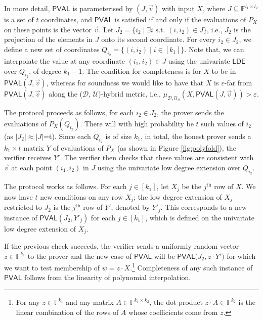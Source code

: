 \documentclass[11pt]{article}
\newcommand{\PVAL}{\mathsf{PVAL}}
\newcommand{\LDE}{\mathsf{LDE}}
\begin{document}
In more detail, $\PVAL$ is parameterised by $(J,\vec{v})$ with input $X$, where $J\subseteq \mathbb{F}^{l_{1}\times l_{2}}$ is a set of $t$ coordinates, and $\PVAL$ is satisfied if and only if the evaluations of $P_X$ on these points is the vector $\vec{v}$. Let $J_{2}=\{i_{2} \mid \exists i \text{ s.t. } (i,i_{2})\in J\}$, i.e., $J_2$ is the projection of the elements in $J$ onto its second coordinate. For every $i_{2}\in J_{2}$, we define a new set of coordinates $Q_{i_{2}}=\{(i,i_{2}) \mid i\in [k_{1}]\}$. Note that, we can interpolate the value at any coordinate $(i_{1},i_{2}) \in J$ using the univariate $\LDE$ over $Q_{i_2}$, of degree $k_1-1$. The condition for completeness is for $X$ to be in $\PVAL(J,\vec{v})$, whereas for soundness we would like to have that $X$ is $\varepsilon$-far from $\PVAL(J,\vec{v})$ along the ($\mathcal{D}$, $\mathcal{U}$)-hybrid metric, i.e., $\mu_{\mathcal{D}, \mathcal{U}_{n}}(X,\PVAL(J,\vec{v}))>\varepsilon$. 

The protocol proceeds as follows, for each $i_{2}\in J_{2}$, the prover sends the evaluations of $P_{X}(Q_{i_{2}})$. There will with high probability be $t$ such values of $i_{2}$ (as $\vert J_{2}\vert\approx\vert J \vert$=t). Since each $Q_{i_{2}}$ is of size $k_{1}$, in total, the honest prover sends a $k_1 \times t$ matrix $Y$ of evaluations of $P_X$ (as shown in Figure \ref{fig:polyfold}), the verifier receives $Y'$. The verifier then checks that these values are consistent with $\vec{v}$ at each point $(i_{1},i_{2})$ in $J$ using the univariate low degree extension over $Q_{i_2}$. 

The \cite{RVW} protocol works as follows. For each $j\in [k_{1}]$, let $X_{j}$ be the $j^{\text{th}}$ row of $X$. We now have $t$ new conditions on any row $X_j$; the low degree extension of $X_{j}$ restricted to $J_{2}$ is the $j^{\text{th}}$ row of $Y'$, denoted by $Y'_j$. This corresponds to a new instance of $\PVAL(J_{2},Y'_j)$ for each $j \in [k_1]$, which is defined on the univariate low degree extension of $X_{j}$. 

If the previous check succeeds, the verifier sends a uniformly random vector $z\in \mathbb{F}^{k_{1}}$ to the prover and the new case of $\PVAL$ will be $\PVAL\bigg(J_{2}, z \cdot Y'\bigg)$ for which we want to test membership of $w = z\cdot X$.\footnote{For any $z \in \mathbb{F}^{k_1}$ and any matrix $A \in \mathbb{F}^{k_1 \times k_2}$, the dot product $z \cdot A \in \mathbb{F}^{k_2}$ is the linear combination of the rows of $A$ whose coefficients come from $z$.} Completeness of any such instance of $\PVAL$ follows from the linearity of polynomial interpolation. 
\end{document}
